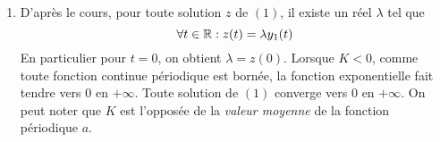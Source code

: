 \begin{enumerate}
\item D'après le cours, pour toute solution $z$ de $(1)$, il existe un réel $\lambda$ tel que
\begin{displaymath}
 \forall t\in \mathbb{R}: z(t)=\lambda y_1(t)
\end{displaymath}
En particulier pour $t=0$, on obtient $\lambda=z(0)$.\newline
Lorsque $K<0$, comme toute fonction continue périodique est bornée, la fonction exponentielle fait tendre vers $0$ en $+\infty$. Toute solution de $(1)$ converge vers $0$ en $+\infty$.\newline
On peut noter que $K$ est l'opposée de la \emph{valeur moyenne} de la fonction périodique $a$.
\end{enumerate}
